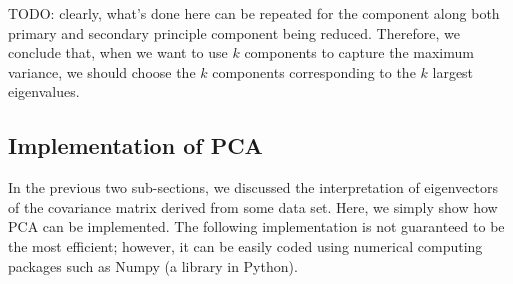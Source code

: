\documentclass{article}
\begin{document}
\vspace{3mm}
TODO: clearly, what's done here can be repeated for the component along both primary and secondary principle component being reduced. Therefore, we conclude that, when we want to use $k$ components to capture the maximum variance, we should choose the $k$ components corresponding to the $k$ largest eigenvalues.

\subsection{Implementation of PCA}

In the previous two sub-sections, we discussed the interpretation of eigenvectors of the covariance matrix derived from some data set. Here, we simply show how PCA can be implemented. The following implementation is not guaranteed to be the most efficient; however, it can be easily coded using numerical computing packages such as Numpy (a library in Python).

\end{document}
